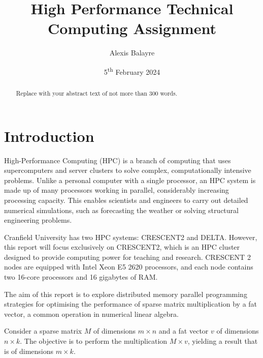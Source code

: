 \documentclass[12pt,oneside]{book} %
\title{High Performance Technical Computing Assignment}
\author{Alexis Balayre}
\date{5\textsuperscript{th} February 2024}
\begin{document}
\frontmatter

\maketitle

\begin{abstract}
    Replace with your abstract text of not more than 300 words.
\end{abstract}

{
\clearpage
\singlespacing
{
    \tableofcontents
}
\clearpage

\listoffigures

\listoftables
}

\mainmatter
\pagestyle{fancy}
\fancyhead[L]{\nouppercase{\leftmark}}
\fancyhead[R]{\nouppercase{\rightmark}}

\chapter{Introduction}
High-Performance Computing (HPC) is a branch of computing that uses
supercomputers and server clusters to solve complex, computationally intensive
problems. Unlike a personal computer with a single processor, an HPC system is
made up of many processors working in parallel, considerably increasing
processing capacity. This enables scientists and engineers to carry out
detailed numerical simulations, such as forecasting the weather or solving
structural engineering problems.

Cranfield University has two HPC systems: CRESCENT2 and DELTA. However, this
report will focus exclusively on CRESCENT2, which is an HPC cluster designed to
provide computing power for teaching and research. CRESCENT 2 nodes are
equipped with Intel Xeon E5 2620 processors, and each node contains two 16-core
processors and 16 gigabytes of RAM.

The aim of this report is to explore distributed memory parallel programming
strategies for optimising the performance of sparse matrix multiplication by a
fat vector, a common operation in numerical linear algebra.

Consider a sparse matrix $M$ of dimensions $m \times n$ and a fat vector $v$ of
dimensions $n \times k$. The objective is to perform the multiplication $M
    \times v$, yielding a result that is of dimensions $m \times k$.
\end{document}

